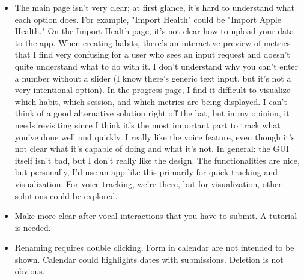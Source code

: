 \documentclass{article}
\begin{document}
\begin{itemize}
	\item The main page isn't very clear; at first glance, it's hard to understand what each option does. For example, "Import Health" could be "Import Apple Health." On the Import Health page, it's not clear how to upload your data to the app. When creating habits, there's an interactive preview of metrics that I find very confusing for a user who sees an input request and doesn't quite understand what to do with it. I don't understand why you can't enter a number without a slider (I know there's generic text input, but it's not a very intentional option). In the progress page, I find it difficult to visualize which habit, which session, and which metrics are being displayed. I can't think of a good alternative solution right off the bat, but in my opinion, it needs revisiting since I think it's the most important part to track what you've done well and quickly. I really like the voice feature, even though it's not clear what it's capable of doing and what it's not. In general: the GUI itself isn't bad, but I don't really like the design. The functionalities are nice, but personally, I'd use an app like this primarily for quick tracking and visualization. For voice tracking, we're there, but for visualization, other solutions could be explored.
	\item Make more clear after vocal interactions that you have to submit. A tutorial is needed.
	\item Renaming requires double clicking. Form in calendar are not intended to be shown. Calendar could highlights dates with submissions. Deletion is not obvious.
\end{itemize}
\end{document}

